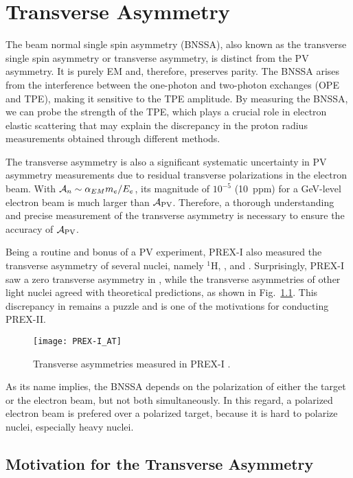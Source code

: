 \chapter{Transverse Asymmetry}
The beam normal single spin asymmetry (BNSSA), also known as the transverse single spin asymmetry
or transverse asymmetry, is distinct from the PV asymmetry. It is purely EM 
and, therefore, preserves parity. The BNSSA arises from the interference
between the one-photon and two-photon exchanges (OPE and TPE), making it sensitive 
to the TPE amplitude. By measuring the BNSSA, we can probe the strength of the TPE, which
plays a crucial role in electron elastic scattering that may explain the discrepancy
in the proton radius measurements obtained through different methods.

The transverse asymmetry is also a significant systematic uncertainty in PV 
asymmetry measurements due to residual transverse polarizations in the electron beam. 
With $\mathcal{A}_n \sim \alpha_{EM}m_e/E_e$, its magnitude of $10^{-5}$ (10~ppm)
for a GeV-level electron beam is much larger than $\mathcal{A}_{\text{PV}}$. Therefore, 
a thorough understanding and precise measurement of the transverse asymmetry is necessary
to ensure the accuracy of $\mathcal{A}_{\text{PV}}$.

Being a routine and bonus of a PV experiment, PREX-I also measured the transverse
asymmetry of several nuclei, namely ${}^{1}$H, \He, \Carbon and \Pb. Surprisingly, PREX-I
saw a zero transverse asymmetry in \Pb, while the transverse asymmetries of other 
light nuclei agreed with theoretical predictions, as shown in 
Fig.~\ref{fig:PREX-I_AT}. This discrepancy in \Pb remains a puzzle and is one of the motivations for conducting PREX-II. 
\begin{figure}[!h]
    \centering
    \texttt{[image: PREX-I\_AT]}
    \caption{Transverse asymmetries measured in PREX-I \cite{PhysRevLett.109.192501}.}
    \label{fig:PREX-I_AT}
\end{figure}

As its name implies, the BNSSA depends on the polarization of either the target or the
electron beam, but not both simultaneously. In this regard, a polarized electron 
beam is prefered over a polarized target,
because it is hard to polarize nuclei, especially heavy nuclei.

\section{Motivation for the Transverse Asymmetry}

